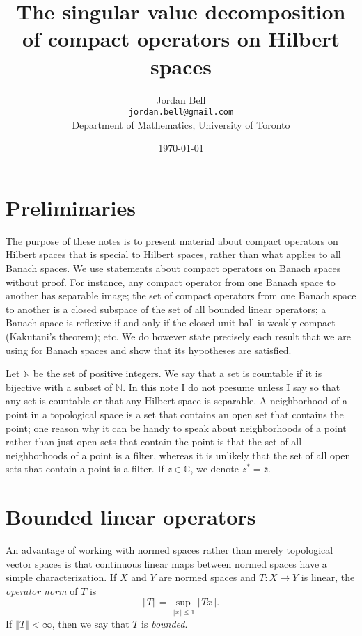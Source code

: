 \documentclass{article}
\newcommand{\norm}[1]{\left\Vert #1 \right\Vert}
\theoremstyle{definition}
\begin{document}
\title{The singular value decomposition of compact operators on Hilbert spaces}
\author{Jordan Bell\\ \texttt{jordan.bell@gmail.com}\\Department of Mathematics, University of Toronto}
\date{\today}

\maketitle

\section{Preliminaries}
The purpose of these notes is to present material about compact operators on Hilbert spaces that is special  to Hilbert spaces, rather than what applies to all Banach spaces. 
We use statements about compact operators on Banach spaces without proof.  For instance, any compact  operator
from one Banach space to another has separable image; the set of compact operators from one Banach space to another is a closed subspace of the set of all bounded
linear operators; a Banach space is reflexive if and only if the closed unit ball is weakly compact (Kakutani's theorem); etc. We do however state precisely each result that we are using for Banach spaces and show that  its hypotheses are satisfied.

Let
$\mathbb{N}$ be the set of positive integers. We say that a set is countable if it is bijective with a subset of
$\mathbb{N}$.
In this note I do not presume unless I say so that any set is countable or that any Hilbert space is separable. A neighborhood of a point in a topological space is a set that contains an open set that
contains the point; one reason why it can be handy to speak about neighborhoods of a point rather than just open sets that contain the point is that
the set of all neighborhoods of a point is a filter, whereas it is unlikely that the set of all open sets that contain a point is a filter. If $z \in \mathbb{C}$, we denote $z^* = \overline{z}$.

\section{Bounded linear operators}
An advantage of working with normed spaces rather than merely topological vector spaces is that continuous linear maps between normed spaces have a
simple characterization. If $X$ and $Y$ are normed spaces and $T:X \to Y$ is linear, the {\em operator norm} of $T$ is
\[
\norm{T} = \sup_{\norm{x} \leq 1} \norm{Tx}.
\]
If $\norm{T} < \infty$, then we say that $T$ is {\em bounded}. 
\end{document}
